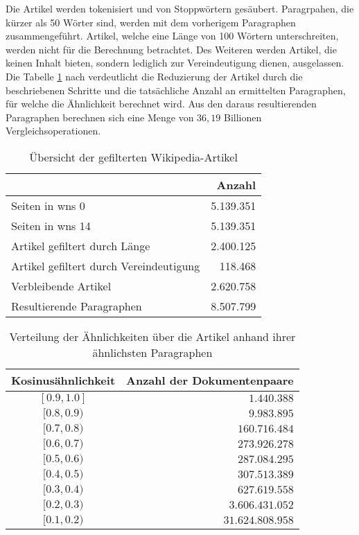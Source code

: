 Die Artikel werden tokenisiert und von Stoppwörtern gesäubert.
Paragrpahen, die kürzer als 50 Wörter sind, werden mit dem vorherigem Paragraphen zusammengeführt. 
Artikel, welche eine Länge von 100 Wörtern unterschreiten, werden nicht für die Berechnung betrachtet.
Des Weiteren werden Artikel, die keinen Inhalt bieten, sondern lediglich zur Vereindeutigung dienen, ausgelassen.
Die Tabelle \ref{tab:simMatrix-overview} nach \cite{licht:2017} verdeutlicht die Reduzierung der Artikel durch die beschriebenen Schritte und die tatsächliche Anzahl an ermittelten Paragraphen, für welche die Ähnlichkeit berechnet wird.
Aus den daraus resultierenden Paragraphen berechnen sich eine Menge von $36,19$ Billionen Vergleichsoperationen.

\begin{table}
\centering
\begin{tabular}{l r}
  \hline
  & Anzahl \\
  \hline
  Seiten in wns 0 & 5.139.351 \\
  Seiten in wns 14 & 5.139.351 \\
  Artikel gefiltert durch Länge & 2.400.125 \\
  Artikel gefiltert durch Vereindeutigung & 118.468 \\
  Verbleibende Artikel & 2.620.758 \\
  Resultierende Paragraphen & 8.507.799 \\
  \hline
\end{tabular}
\caption{Übersicht der gefilterten Wikipedia-Artikel}
\label{tab:simMatrix-overview}
\end{table}

\begin{table}
\centering
\begin{tabular}{c r}
  \hline
  Kosinus\"ahnlichkeit & Anzahl der Dokumentenpaare \\
  \hline
  $[0.9,1.0]$ & $1.440.388$\\
  $[0.8,0.9)$ & $9.983.895$\\
  $[0.7,0.8)$ & $160.716.484$\\
  $[0.6,0.7)$ & $273.926.278$\\
  $[0.5,0.6)$ & $287.084.295$\\
  $[0.4,0.5)$ & $307.513.389$\\
  $[0.3,0.4)$ & $627.619.558$\\
  $[0.2,0.3)$ & $3.606.431.052$\\
  $[0.1,0.2)$ & $31.624.808.958$\\
  \hline
\end{tabular}
\caption{Verteilung der Ähnlichkeiten über die Artikel anhand ihrer ähnlichsten Paragraphen}
\label{tab:simMatrix-overview-sims}
\end{table}

